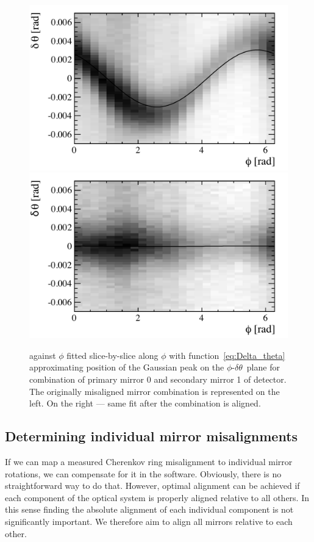 \begin{figure}[htbp]
  \vspace{-0.5\baselineskip}
  \centering
  \includegraphics[width=.49\textwidth]
    {figs/Method/RICH1_ThetaVsPhiRec0001_misaligned.pdf}
  \includegraphics[width=.49\textwidth]
    {figs/Method/RICH1_ThetaVsPhiRec0001_aligned.pdf}
  \vspace{-1.0\baselineskip}
  \caption{
    \deltatheta against $\phi$ fitted slice-by-slice along $\phi$ with
    function~\eqref{eq:Delta_theta} approximating position of the Gaussian peak
    on the $\phi\text{-}\delta\theta$~plane for combination of primary mirror 0
    and secondary mirror 1 of \richone detector. The originally misaligned
    mirror combination is represented on the left. On the right --- same fit
    after the combination is aligned.}
  \label{fig:Rich1Mirr0001dThetavphiRec}
  \vspace{-0.5\baselineskip}
\end{figure}


\subsection{Determining individual mirror misalignments}
\label{subsec:IndivMirrAlign}

If we can map a measured Cherenkov ring misalignment to individual mirror
rotations, we can compensate for it in the software. Obviously, there is no
straightforward way to do that. However, optimal alignment can be achieved if
each component of the optical system is properly aligned relative to all others.
In this sense finding the absolute alignment of each individual component is not
significantly important. We therefore aim to align all mirrors relative to each
other.


